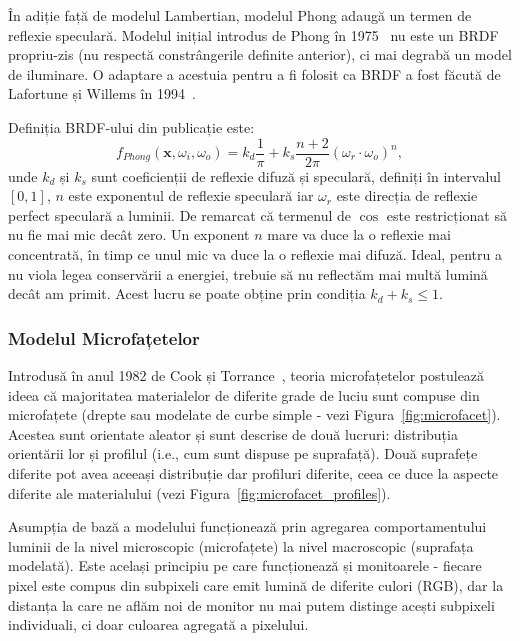 \documentclass[12pt,a4paper]{report}
\numberwithin{equation}{section} %
\begin{document}
În adiție față de modelul Lambertian, modelul Phong adaugă un termen de reflexie
speculară. Modelul inițial introdus de Phong în 1975~\cite{Phong} nu este un BRDF
propriu-zis (nu respectă constrângerile definite anterior), ci mai degrabă un model de iluminare. O adaptare a acestuia pentru
a fi folosit ca BRDF a fost făcută de Lafortune și Willems în 1994~\cite{Lafortune}.

Definiția BRDF-ului din publicație este:
\begin{equation}
	f_{Phong}(\mathbf{x}, \omega_i, \omega_o) = k_d\frac{1}{\pi} + k_s\frac{n + 2}{2\pi}(\omega_r \cdot \omega_o)^n,
\end{equation}
unde $k_d$ și $k_s$ sunt coeficienții de reflexie difuză și speculară, definiți
în intervalul $[0, 1]$, $n$ este exponentul de reflexie speculară iar $\omega_r$ este
direcția de reflexie perfect speculară a luminii. De remarcat că termenul de $\cos$
este restricționat să nu fie mai mic decât zero. Un exponent $n$ mare va duce la o
reflexie mai concentrată, în timp ce unul mic va duce la o reflexie mai difuză.
Ideal, pentru a nu viola legea conservării a energiei, trebuie să nu reflectăm mai multă lumină
decât am primit. Acest lucru se poate obține prin condiția $k_d + k_s \leq 1$.

\subsubsection*{Modelul Microfațetelor}
Introdusă în anul 1982 de Cook și Torrance~\cite{CookTorrance}, teoria microfațetelor postulează ideea că
majoritatea materialelor de diferite grade de luciu sunt compuse din microfațete
(drepte sau modelate de curbe simple - vezi Figura~\ref{fig:microfacet}). Acestea sunt orientate aleator și
sunt descrise de două lucruri: distribuția orientării lor și profilul (i.e.,
cum sunt dispuse pe suprafață). Două suprafețe diferite pot avea aceeași distribuție
dar profiluri diferite, ceea ce duce la aspecte diferite ale materialului (vezi Figura~\ref{fig:microfacet_profiles}).

Asumpția de bază a modelului funcționează prin agregarea comportamentului
luminii de la nivel microscopic (microfațete) la nivel macroscopic (suprafața modelată).
Este același principiu pe care funcționează și monitoarele - fiecare pixel este compus
din subpixeli care emit lumină de diferite culori (RGB), dar la distanța la care
ne aflăm noi de monitor nu mai putem distinge acești subpixeli individuali, ci doar
culoarea agregată a pixelului.
\end{document}
